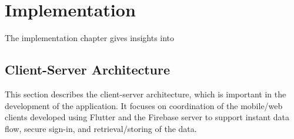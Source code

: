 \chapter{Implementation}\label{chap:devel}

The implementation chapter gives insights into 

\section{Client-Server Architecture}

This section describes the client-server architecture, which is important in the development of the application. It focuses on coordination of the mobile/web clients developed using Flutter and the Firebase server to support instant data flow, secure sign-in, and retrieval/storing of the data.

